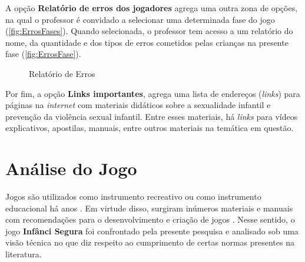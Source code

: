 \documentclass[alpha-refs,brazilian]{RBCA_v2.0}
\begin{document}
A opção \textbf{Relatório de erros dos jogadores} agrega uma outra zona de opções, na qual o professor é convidado a selecionar uma determinada fase do jogo (\cref{fig:ErrosFases}). Quando selecionada, o professor tem acesso a um relatório do nome, da quantidade e dos tipos de erros cometidos pelas crianças na presente fase (\cref{fig:ErrosFase}).

 \begin{figure}[h]
  \centering
  \hspace{0.1mm}
  \caption{Relatório de Erros}
  \label{fig:RelatorioErros}
\end{figure}

Por fim, a opção \textbf{Links importantes}, agrega uma lista de endereços (\textit{links}) para páginas na \textit{internet} com materiais didáticos sobre a sexualidade infantil e prevenção da violência sexual infantil. Entre esses materiais, há \textit{links} para vídeos explicativos, apostilas, manuais, entre outros materiais na temática em questão.


\section{Análise do Jogo}\label{secao:EstudoArte}

Jogos são utilizados como instrumento recreativo ou como instrumento educacional há anos \citep{batista2007estudo, tarouco2004jogos}. Em virtude disso, surgiram inúmeros materiais e manuais com recomendações para o desenvolvimento e criação de jogos \citep{arruda2014fundamentos, alves2019unity}. Nesse sentido, o jogo \textbf{Infânci Segura} foi confrontado pela presente pesquisa e analisado sob uma visão técnica no que diz respeito ao cumprimento de certas normas presentes na literatura. 
\end{document}
